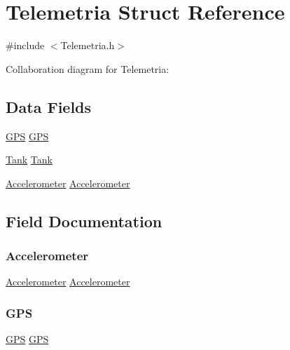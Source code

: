 \hypertarget{struct_telemetria}{}\section{Telemetria Struct Reference}
\label{struct_telemetria}


{\ttfamily \#include $<$Telemetria.\+h$>$}



Collaboration diagram for Telemetria\+:
\subsection*{Data Fields}
\begin{DoxyCompactItemize}
\item 
\hyperlink{struct_g_p_s}{G\+PS} \hyperlink{struct_telemetria_abcba1fb36a56b22bc8383ec507ad8d13}{G\+PS}
\item 
\hyperlink{struct_tank}{Tank} \hyperlink{struct_telemetria_a5240b2978ed6fee82c42ba9a17153985}{Tank}
\item 
\hyperlink{struct_accelerometer}{Accelerometer} \hyperlink{struct_telemetria_a6e7184666de6d87a1e8286acf58601d3}{Accelerometer}
\end{DoxyCompactItemize}


\subsection{Field Documentation}
\mbox{\label{struct_telemetria_a6e7184666de6d87a1e8286acf58601d3}} 
\subsubsection{\texorpdfstring{Accelerometer}{Accelerometer}}
{\footnotesize\ttfamily \hyperlink{struct_accelerometer}{Accelerometer} \hyperlink{struct_accelerometer}{Accelerometer}}

\mbox{\label{struct_telemetria_abcba1fb36a56b22bc8383ec507ad8d13}} 
\subsubsection{\texorpdfstring{G\+PS}{GPS}}
{\footnotesize\ttfamily \hyperlink{struct_g_p_s}{G\+PS} \hyperlink{struct_g_p_s}{G\+PS}}

